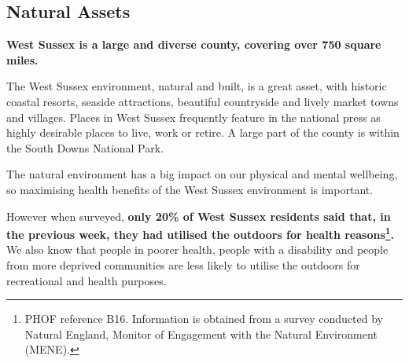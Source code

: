
\subsection{Natural Assets}
{\bfseries West Sussex is a large and diverse county, covering over 750 square miles.}

The West Sussex environment, natural and built, is a great asset, with historic coastal resorts, seaside attractions, beautiful countryside and lively market towns and villages. Places in West Sussex frequently feature in the national press as highly desirable places to live, work or retire. A large part of the county is within the South Downs National Park.

The natural environment has a big impact on our physical and mental wellbeing, so maximising health benefits of the West Sussex environment is important.

However when surveyed, {\bf only 20\% of West Sussex residents said that, in the previous week, they had utilised the outdoors for health reasons\footnote{PHOF reference B16. Information is obtained from a survey conducted by Natural England, Monitor of Engagement with the Natural Environment (MENE).}.} We also know that people in poorer health, people with a disability and people from more deprived communities are less likely to utilise the outdoors for recreational and health purposes.

